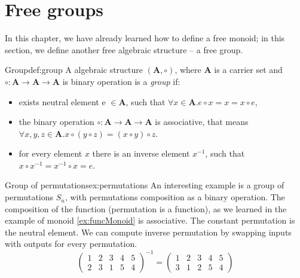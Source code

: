 \section{Free groups}
In this chapter, we have already learned how to define a free monoid; in this section, we define another free algebraic structure -- a free group.
\begin{defi}{Group}{def:group}
A algebraic structure $(\mathbf{A}, \circ)$, where $\mathbf{A}$ is a carrier set and $\circ: \mathbf{A} \rightarrow  \mathbf{A} \rightarrow \mathbf{A}$ is binary operation is a \emph{group} \cite{AbstractAlgebra} if:
\begin{itemize}
    \itemsep 0em 
    \item exists neutral element e $\in \mathbf{A}$, such that $\forall x \in \mathbf{A}. e \circ x = x = x \circ e$,
    \item the binary operation $\circ: \mathbf{A} \rightarrow  \mathbf{A} \rightarrow \mathbf{A}$ is associative, that means $\forall x, y, z \in \mathbf{A}. x \circ (y \circ z) = (x \circ y) \circ z$.
    \item for every element $x$ there is an inverse element $x^{-1}$, such that $x \circ x^{-1} = x^{-1} \circ x = e$.
\end{itemize}
\end{defi}
\begin{example}{Group of permutations}{ex:permutations}
An interesting example is a group of permutations $S_n$, with permutations composition as a binary operation. The composition of the function (permutation is a function), as we learned in the example of monoid \ref{ex:funcMonoid} is associative. The constant permutation is the neutral element. We can compute inverse permutation by swapping inputs with outputs for every permutation.
$$
\begin{pmatrix}
    1 & 2 & 3 & 4 & 5 \\
    2 & 3 & 1 & 5 & 4
\end{pmatrix}^{-1}
=
\begin{pmatrix}
    1 & 2 & 3 & 4 & 5 \\
    3 & 1 & 2 & 5 & 4
\end{pmatrix}
$$
\end{example}

